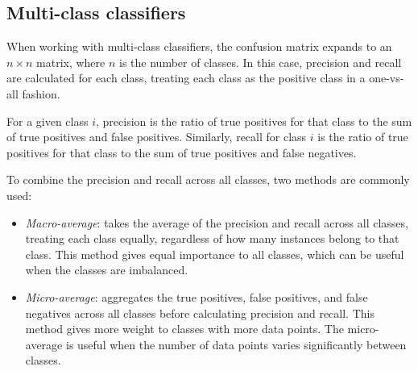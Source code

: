 \subsection{Multi-class classifiers}
When working with multi-class classifiers, the confusion matrix expands to an $n \times n$ matrix, where $n$ is the number of classes. 
In this case, precision and recall are calculated for each class, treating each class as the positive class in a one-vs-all fashion.

For a given class $i$, precision is the ratio of true positives for that class to the sum of true positives and false positives.
Similarly, recall for class $i$ is the ratio of true positives for that class to the sum of true positives and false negatives.

To combine the precision and recall across all classes, two methods are commonly used:
\begin{itemize}
    \item \textit{Macro-average}: takes the average of the precision and recall across all classes, treating each class equally, regardless of how many instances belong to that class. 
        This method gives equal importance to all classes, which can be useful when the classes are imbalanced.
    \item \textit{Micro-average}: aggregates the true positives, false positives, and false negatives across all classes before calculating precision and recall. 
        This method gives more weight to classes with more data points. 
        The micro-average is useful when the number of data points varies significantly between classes.
\end{itemize}